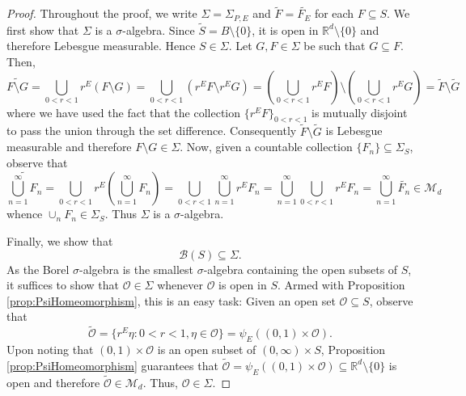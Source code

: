 \documentclass[11pt]{article}
\theoremstyle{remark}
\begin{document}
\begin{proof}
Throughout the proof, we write $\Sigma=\Sigma_{P,E}$ and $\widetilde{F}=\widetilde{F_E}$ for each $F\subseteq S$.
We first show that $\Sigma$ is a $\sigma$-algebra. Since $\widetilde S=B\setminus\{0\}$, it is open in $\mathbb{R}^d\setminus\{0\}$ and therefore Lebesgue measurable. Hence $S\in \Sigma$. Let $G, F\in \Sigma$ be such that $G\subseteq F$. Then,
\begin{equation*}
\widetilde{F\setminus G}=\bigcup_{0<r<1}r^E\left(F\setminus G\right)=\bigcup_{0<r<1}\left(r^EF\setminus r^E G\right)=\left(\bigcup_{0<r<1}r^E F\right)\setminus\left(\bigcup_{0<r<1}r^E G\right)=\widetilde F\setminus \widetilde G
\end{equation*}
where we have used the fact that the collection $\{r^E F\}_{0<r<1}$ is mutually disjoint to pass the union through the set difference. Consequently $\widetilde F\setminus \widetilde{G}$ is Lebesgue measurable and therefore $F\setminus G\in \Sigma$.  Now, given a countable collection $\{F_n\}\subseteq \Sigma_S$, observe that
\begin{equation*}
    \widetilde{\bigcup_{n=1}^\infty F_n}= \bigcup_{0<r<1}r^E \left(\bigcup_{n=1}^\infty F_n\right)= \bigcup_{0 <r< 1}  \bigcup_{n=1}^\infty  r^E F_n =\bigcup_{n=1}^\infty \bigcup_{0 <r < 1}  r^E F_n =\bigcup_{n=1}^\infty \widetilde{F_n} \in \mathcal{M}_d
\end{equation*}
whence $\cup_n F_n\in \Sigma_S$. Thus $\Sigma$ is a $\sigma$-algebra. 

Finally, we show that
\begin{equation*}
\mathcal{B}(S)\subseteq\Sigma.
\end{equation*}
As the Borel $\sigma$-algebra is the smallest $\sigma$-algebra containing the open subsets of $S$, it suffices to show that $\mathcal{O}\in \Sigma$ whenever $\mathcal{O}$ is open in $S$. Armed with Proposition \ref{prop:PsiHomeomorphism}, this is an easy task: Given an open set $\mathcal{O}\subseteq S$, observe that
\begin{equation*}
\widetilde{\mathcal{O}}=\{r^E\eta:0<r<1,\eta\in\mathcal{O}\}=\psi_E((0,1)\times\mathcal{O}).
\end{equation*}
Upon noting that $(0,1)\times\mathcal{O}$ is an open subset of $(0,\infty)\times S$, Proposition \ref{prop:PsiHomeomorphism} guarantees that $\widetilde{\mathcal{O}}=\psi_E((0,1)\times\mathcal{O})\subseteq\mathbb{R}^d\setminus\{0\}$ is open and therefore $\widetilde{\mathcal{O}} \in \mathcal{M}_d$. Thus, $\mathcal{O}\in \Sigma$.
\end{proof}
\end{document}
